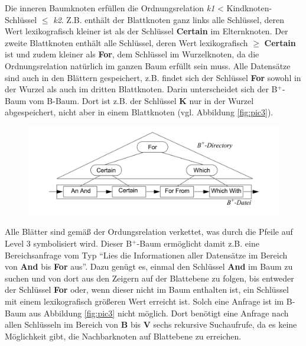 Die inneren Baumknoten erfüllen die Ordnungsrelation \textit{k1} < Kindknoten-Schlüssel $\leq$ \textit{k2}. Z.B. enthält der Blattknoten ganz links alle Schlüssel, deren Wert lexikografisch kleiner ist als der Schlüssel \textbf{Certain} im Elternknoten. Der zweite Blattknoten enthält alle Schlüssel, deren Wert lexikografisch $\geq$ \textbf{Certain} ist und zudem kleiner als \textbf{For}, dem Schlüssel im Wurzelknoten, da die Ordnungsrelation natürlich im ganzen Baum erfüllt sein muss. Alle Datensätze sind auch in den Blättern gespeichert, z.B. findet sich der Schlüssel \textbf{For} sowohl in der Wurzel als auch im dritten Blattknoten. Darin unterscheidet sich der B$^+$-Baum vom B-Baum. Dort ist z.B. der Schlüssel \textbf{K} nur in der Wurzel abgespeichert, nicht aber in einem 
Blattknoten (vgl. Abbildung \ref{fig:pic3}).  
\begin{figure}[hpbt]
  \centering
  \label{fig:pic4}
  \includegraphics[width=1.0\textwidth]{pictures/b+baum.png}
\end{figure}
\noindent
Alle Blätter sind gemäß der Ordungsrelation verkettet, was durch die Pfeile auf Level 3 symbolisiert wird. Dieser B$^+$-Baum ermöglicht damit z.B. eine Bereichsanfrage vom Typ "`Lies die Informationen aller Datensätze im Bereich von \textbf{And} bis \textbf{For} aus"'. Dazu genügt es, einmal den Schlüssel \textbf{And} im Baum zu suchen und von dort aus den Zeigern auf der Blattebene zu folgen, bis entweder der Schlüssel \textbf{For} oder, wenn dieser nicht im Baum enthalten ist, ein Schlüssel mit einem lexikografisch größeren Wert erreicht ist. Solch eine Anfrage ist im B-Baum aus Abbildung \ref{fig:pic3} nicht möglich. Dort benötigt eine Anfrage nach allen Schlüsseln im Bereich von \textbf{B} bis \textbf{V} sechs rekursive Suchaufrufe, da es keine Möglichkeit gibt, die Nachbarknoten auf Blattebene zu erreichen. 
 
